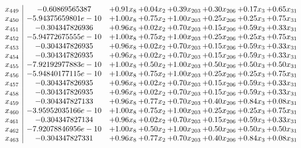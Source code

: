 \documentclass[8pt]{article}
\begin{document}
\[\begin{array}{c| c c@{\hskip 2pt} c@{\hskip 2pt} c@{\hskip 2pt} c@{\hskip 2pt} c@{\hskip 2pt} c@{\hskip 2pt} }
 x_{449}   &  -0.60869565387 & +  0.91 x_{8} & +  0.04 x_{2} & +  0.39 x_{203} & +  0.30 x_{206} & +  0.17 x_{3} & +  0.65 x_{31}\\
 x_{450}   &  -5.94375659801e-10 & +  1.00 x_{8} & +  0.75 x_{2} & +  1.00 x_{203} & +  0.25 x_{206} & +  0.25 x_{3} & +  0.75 x_{31}\\
 x_{451}   &  -0.304347826936 & +  0.96 x_{8} & +  0.02 x_{2} & +  0.70 x_{203} & +  0.15 x_{206} & +  0.59 x_{3} & +  0.33 x_{31}\\
 x_{452}   &  -5.94772675555e-10 & +  1.00 x_{8} & +  0.75 x_{2} & +  1.00 x_{203} & +  0.25 x_{206} & +  0.25 x_{3} & +  0.75 x_{31}\\
 x_{453}   &  -0.304347826935 & +  0.96 x_{8} & +  0.02 x_{2} & +  0.70 x_{203} & +  0.15 x_{206} & +  0.59 x_{3} & +  0.33 x_{31}\\
 x_{454}   &  -0.304347826935 & +  0.96 x_{8} & +  0.02 x_{2} & +  0.70 x_{203} & +  0.15 x_{206} & +  0.59 x_{3} & +  0.33 x_{31}\\
 x_{455}   &  -7.92192977883e-10 & +  1.00 x_{8} & +  0.50 x_{2} & +  1.00 x_{203} & +  0.50 x_{206} & +  0.50 x_{3} & +  0.50 x_{31}\\
 x_{456}   &  -5.94840177115e-10 & +  1.00 x_{8} & +  0.75 x_{2} & +  1.00 x_{203} & +  0.25 x_{206} & +  0.25 x_{3} & +  0.75 x_{31}\\
 x_{457}   &  -0.304347826935 & +  0.96 x_{8} & +  0.02 x_{2} & +  0.70 x_{203} & +  0.15 x_{206} & +  0.59 x_{3} & +  0.33 x_{31}\\
 x_{458}   &  -0.304347826935 & +  0.96 x_{8} & +  0.02 x_{2} & +  0.70 x_{203} & +  0.15 x_{206} & +  0.59 x_{3} & +  0.33 x_{31}\\
 x_{459}   &  -0.304347827133 & +  0.96 x_{8} & +  0.77 x_{2} & +  0.70 x_{203} & +  0.40 x_{206} & +  0.84 x_{3} & +  0.08 x_{31}\\
 x_{460}   &  -3.95952035166e-10 & +  1.00 x_{8} & +  0.75 x_{2} & +  1.00 x_{203} & +  0.25 x_{206} & +  0.25 x_{3} & +  0.75 x_{31}\\
 x_{461}   &  -0.304347827134 & +  0.96 x_{8} & +  0.02 x_{2} & +  0.70 x_{203} & +  0.15 x_{206} & +  0.59 x_{3} & +  0.33 x_{31}\\
 x_{462}   &  -7.92078846956e-10 & +  1.00 x_{8} & +  0.50 x_{2} & +  1.00 x_{203} & +  0.50 x_{206} & +  0.50 x_{3} & +  0.50 x_{31}\\
 x_{463}   &  -0.304347827331 & +  0.96 x_{8} & +  0.77 x_{2} & +  0.70 x_{203} & +  0.40 x_{206} & +  0.84 x_{3} & +  0.08 x_{31}\\

\end{array}\]
\end{document}

